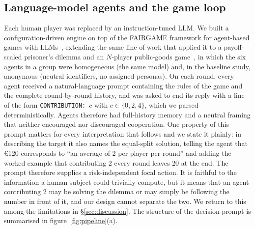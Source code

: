 \documentclass[openacc]{rsproca_new}
\begin{document}
\subsection{Language-model agents and the game loop}
Each human player was replaced by an instruction-tuned LLM. We built a configuration-driven engine on top of the FAIRGAME framework for agent-based games with LLMs~\cite{buscemi2025fairgame}, extending the same line of work that applied it to a payoff-scaled prisoner's dilemma and an $N$-player public-goods game~\cite{huynh2025understanding}, in which the six agents in a group were homogeneous (the same model) and, in the baseline study, anonymous (neutral identifiers, no assigned personas). On each round, every agent received a natural-language prompt containing the rules of the game and the complete round-by-round history, and was asked to end its reply with a line of the form \texttt{CONTRIBUTION:}~$c$ with $c\in\{0,2,4\}$, which we parsed deterministically. Agents therefore had full-history memory and a neutral framing that neither encouraged nor discouraged cooperation. One property of this prompt matters for every interpretation that follows and we state it plainly: in describing the target it also names the equal-split solution, telling the agent that \euro{}120 corresponds to ``an average of 2 per player per round'' and adding the worked example that contributing 2 every round leaves 20 at the end. The prompt therefore supplies a risk-independent focal action. It is faithful to the information a human subject could trivially compute, but it means that an agent contributing 2 may be solving the dilemma or may simply be following the number in front of it, and our design cannot separate the two. We return to this among the limitations in \S\ref{sec:discussion}. The structure of the decision prompt is summarised in figure~\ref{fig:pipeline}(a).
\end{document}
